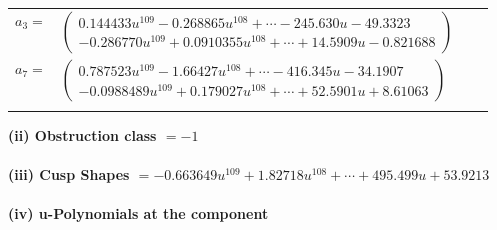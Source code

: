 \documentclass[1p]{elsarticle_modified}
\theoremstyle{definition}
\begin{document}
\begin{tabular}{m{7pt} m{180pt} m{7pt} m{180pt} }
\flushright $a_{3}=$&$\begin{pmatrix}0.144433 u^{109}-0.268865 u^{108}+\cdots-245.630 u-49.3323\\-0.286770 u^{109}+0.0910355 u^{108}+\cdots+14.5909 u-0.821688\end{pmatrix}$ \\
\flushright $a_{7}=$&$\begin{pmatrix}0.787523 u^{109}-1.66427 u^{108}+\cdots-416.345 u-34.1907\\-0.0988489 u^{109}+0.179027 u^{108}+\cdots+52.5901 u+8.61063\end{pmatrix}$\\&\end{tabular}
\flushleft \textbf{(ii) Obstruction class $= -1$}\\~\\
\flushleft \textbf{(iii) Cusp Shapes $= -0.663649 u^{109}+1.82718 u^{108}+\cdots+495.499 u+53.9213$}\\~\\
\newpage\renewcommand{\arraystretch}{1}
\flushleft \textbf{(iv) u-Polynomials at the component}\newline \\
\end{document}
